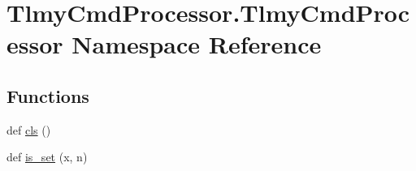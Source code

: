 \hypertarget{namespace_tlmy_cmd_processor_1_1_tlmy_cmd_processor}{}\section{Tlmy\+Cmd\+Processor.\+Tlmy\+Cmd\+Processor Namespace Reference}
\label{namespace_tlmy_cmd_processor_1_1_tlmy_cmd_processor}
\subsection*{Functions}
\begin{DoxyCompactItemize}
\item 
def \hyperlink{namespace_tlmy_cmd_processor_1_1_tlmy_cmd_processor_af0147d96af788791368b9d5746f8699b}{cls} ()
\item 
def \hyperlink{namespace_tlmy_cmd_processor_1_1_tlmy_cmd_processor_ab7f13d4bc6ea5a22f667153a21147f64}{is\+\_\+set} (x, n)
\end{DoxyCompactItemize}
